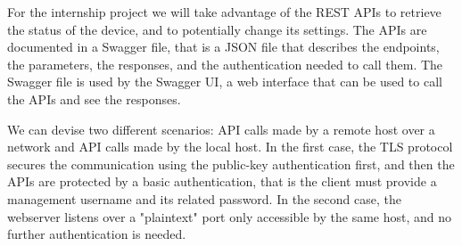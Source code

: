 For the internship project we will take advantage of the REST APIs to retrieve the status of the device, and to potentially change its settings. The APIs are documented in a Swagger file, that is a JSON file that describes the endpoints, the parameters, the responses, and the authentication needed to call them. The Swagger file is used by the Swagger UI, a web interface that can be used to call the APIs and see the responses.

We can devise two different scenarios: API calls made by a remote host over a network and API calls made by the local host. In the first case, the TLS protocol secures the communication using the public-key authentication first, and then the APIs are protected by a basic authentication, that is the client must provide a management username and its related password. In the second case, the webserver listens over a "plaintext" port only accessible by the same host, and no further authentication is needed.

